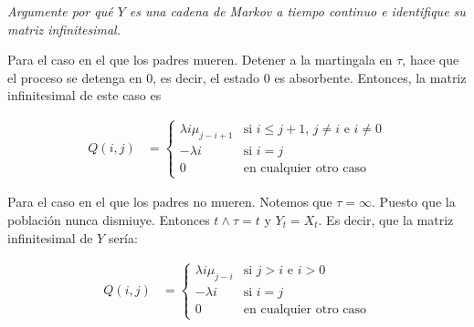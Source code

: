 \emph{
    Argumente por qu\'e $Y$ es una cadena de Markov a tiempo continuo e identifique su 
    matriz infinitesimal.\pn
}

\afterstatement\pn

Para el caso en el que los padres mueren. Detener a la martingala en $\tau$, hace que
el proceso se detenga en $0$, es decir, el estado $0$ es absorbente. Entonces, la matriz 
infinitesimal de este caso es

\begin{align}
        Q(i,j)  &=
                \begin{cases}
                    \lambda i \mu_{j-i+1}   &    \text{si $i \leq j+1$, $j \neq i$ e $i \neq 0$}    \\
                    -\lambda i              &    \text{si $i = j$}                                  \\
                    0                       &    \text{en cualquier otro caso}
                \end{cases}
\end{align}

Para el caso en el que los padres no mueren. Notemos que $\tau = \infty$. Puesto que la población
nunca dismiuye. Entonces $t \wedge \tau = t$ y $Y_t = X_t$. Es decir, que la matriz infinitesimal
de $Y$ sería:

\begin{align}
        Q(i,j)  &=
                \begin{cases}
                    \lambda i \mu_{j-i}     &    \text{si $j > i$ e $i > 0$}        \\
                    -\lambda i              &    \text{si $i = j$}                  \\
                    0                       &    \text{en cualquier otro caso}
                \end{cases}
\end{align}